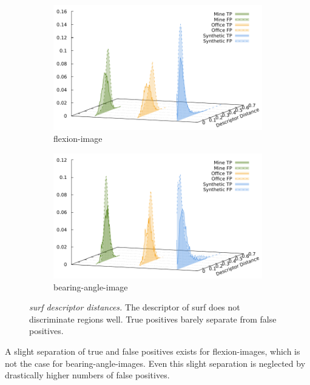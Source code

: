 \begin{figure}[htb]
\begin{subfigure}[t]{0.45\linewidth}
    \includegraphics[width=\linewidth]{chapter06/results/SURF/flexion/descriptor_distances.pdf}%
    \caption{\gls{flexion-image}}
\end{subfigure}\quad
\begin{subfigure}[t]{0.45\linewidth}
    \includegraphics[width=\linewidth]{chapter06/results/SURF/bearing/descriptor_distances.pdf}%
    \caption{\gls{bearing-angle-image}}
\end{subfigure}
\caption[\acrshort{surf} descriptor distances]{\emph{\acrshort{surf} descriptor distances.} The descriptor of \acrshort{surf} does not discriminate regions well. True positives barely separate from false positives.}\label{fig:surf_descriptor_distance}
\end{figure}
A slight separation of true and false positives exists for \glspl{flexion-image}, which is not the case for \glspl{bearing-angle-image}.
Even this slight separation is neglected by drastically higher numbers of false positives.
